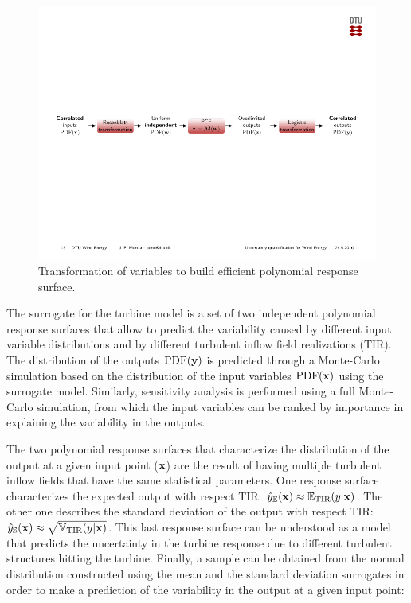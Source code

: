 \documentclass[preprint,12pt]{elsarticle}
\begin{document}

\begin{figure}[h!]
\begin{centering}
\includegraphics[width=\columnwidth]{Figures/2_transfromation_steps.pdf}
\caption{Transformation of variables to build efficient polynomial response surface.}
\label{fig_2_trans}
\end{centering}
\end{figure}

The surrogate for the turbine model is a set of two independent polynomial response surfaces that allow to predict the variability caused by different input variable distributions and by different turbulent inflow field realizations (TIR). The distribution of the outputs $\mathrm{PDF}(\mathbf{y})$ is predicted through a Monte-Carlo simulation based on the distribution of the input variables $\mathrm{PDF}(\mathbf{x})$ using the surrogate model. Similarly, sensitivity analysis is performed using a full Monte-Carlo simulation, from which the input variables can be ranked by importance in explaining the variability in the outputs. 

The two polynomial response surfaces that characterize the distribution of the output at a given input point ($\mathbf{x}$) are the result of having multiple turbulent inflow fields that have the same statistical parameters. One response surface characterizes the expected output with respect TIR: $\hat{y}_{\mathbb{E}}(\mathbf{x})\approx \mathbb{E}_{\text{TIR}}(y|\mathbf{x})$. The other one describes the standard deviation of the output with respect TIR: $\hat{y}_{\mathbb{S}}(\mathbf{x}) \approx \sqrt{\mathbb{V}_{\text{TIR}}(y|\mathbf{x})}$. This last response surface can be understood as a model that predicts the uncertainty in the turbine response due to different turbulent structures hitting the turbine. Finally, a sample can be obtained from the normal distribution constructed using the mean and the standard deviation surrogates in order to make a prediction of the variability in the output at a given input point:
\end{document}
